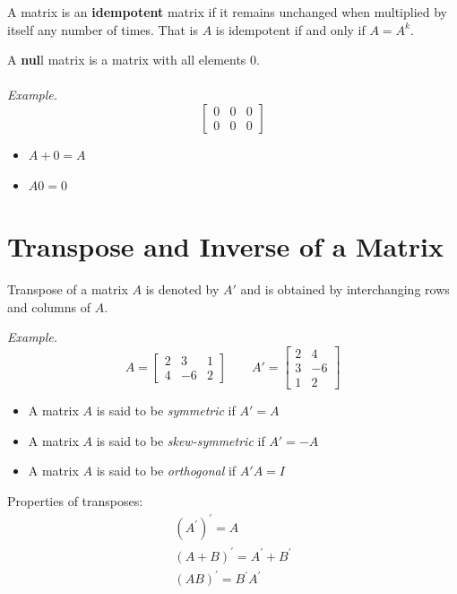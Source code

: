 \documentclass{./../../latex/handout}
\begin{document}
A matrix is an \textbf{idempotent} matrix if it remains unchanged when multiplied by itself any number of times. That is $A$ is idempotent if and only if $A = A^k$. 

A \textbf{nul}l matrix is a matrix with all elements $0$. \\~\\
\textit{Example.} \[\begin{bmatrix}
0 & 0 & 0 \\
0 & 0 & 0
\end{bmatrix}\]
\begin{itemize}
\item $A + 0 = A$
\item $A 0 = 0$
\end{itemize}


\section{Transpose and Inverse of a Matrix}

Transpose of a matrix $A$ is denoted by $A'$ and is obtained by interchanging rows and columns of $A$. 

\textit{Example.} \[A = \begin{bmatrix}
2 & 3 & 1 \\
4 & -6 & 2
\end{bmatrix} \quad \quad A' = \begin{bmatrix}
2 & 4 \\
3 & -6 \\
1 & 2
\end{bmatrix}\]

\begin{itemize}
\item A matrix $A$ is said to be \textit{symmetric} if $A'=A$
\item A matrix $A$ is said to be \textit{skew-symmetric} if $A'=-A$
\item A matrix $A$ is said to be \textit{orthogonal} if $A'A=I$
\end{itemize}

Properties of transposes:
\[
\begin{array}{l}
\left(A^{\prime}\right)^{\prime}=A \\
(A+B)^{\prime}=A^{\prime}+B^{\prime} \\
(A B)^{\prime}=B^{\prime} A^{\prime} \\
\end{array}
\] \\
\end{document}
